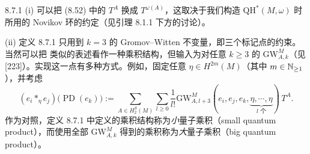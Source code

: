 \begin{wrem}{8.7.1}
(i) 可以把 (8.52) 中的 $T^A$ 换成 $T^{\omega(A)}$，这取决于我们构造
$\mathrm{QH}^*(M,\omega)$ 时所用的 Novikov 环的约定（见引理 8.1.1 下方的讨论）。

(ii) 定义 8.7.1 只用到 $k=3$ 的 Gromov--Witten 不变量，即三个标记点的约束。当然可以把
类似的表述看作一种乘积结构，但输入为对任意 $k\ge3$ 的 $\mathrm{GW}^M_{A,k}$（见
[223]）。实现这一点有多种方式。例如，固定任意
$\eta\in H^{2m}(M)$（其中 $m\in\mathbb{N}_{\ge1}$），并考虑
\[
  (e_i*_\eta e_j)\big(\operatorname{PD}(e_k)\big)
  :=\sum_{A\in H_2^S(M)}\sum_{l\ge0}\frac{1}{l!}
  \mathrm{GW}^M_{A,l+3}(e_i,e_j,e_k,
  \underbrace{\eta,\cdots,\eta}_{l\text{ 个}})\,T^A .
\]
作为对照，定义 8.7.1 中定义的乘积结构称为\emph{小}量子乘积（small quantum
product），而使用全部 $\mathrm{GW}^M_{A,k}$ 得到的乘积称为\emph{大}量子乘积（big
quantum product）。
\end{wrem}

